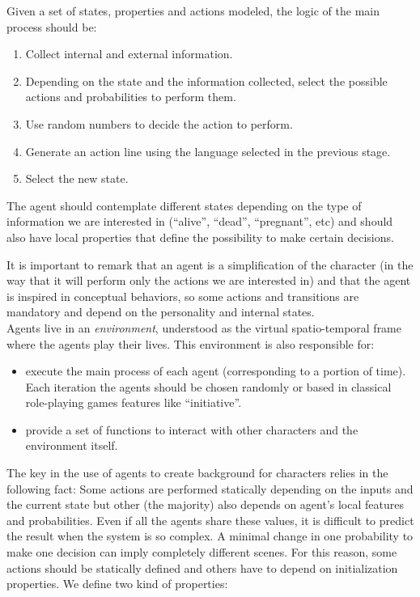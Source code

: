 \documentclass[letterpaper]{article}
\begin{document}
Given a set of states, properties and actions modeled, the logic of the main process should be:

\begin{enumerate}
\item Collect internal and external information.
\item Depending on the state and the information collected, select the possible actions and probabilities to perform them.
\item Use random numbers to decide the action to perform.
\item Generate an action line using the language selected in the previous stage.
\item Select the new state.
\end{enumerate}


The agent should contemplate different states depending on the type of information we are interested in (``alive'', ``dead'', ``pregnant'', etc) and should also have local properties that define the possibility to make certain decisions.

It is important to remark that an agent is a simplification of the character (in the way that it will perform only the actions we are interested in) and that the agent is inspired in conceptual behaviors, so some actions and transitions are mandatory and depend on the personality and internal states.\\


Agents live in an {\em environment}, understood as the virtual spatio-temporal frame where the agents play their lives. This environment is also responsible for:
\begin{itemize}
\item execute the main process of each agent (corresponding to a portion of time). Each iteration the agents should be chosen randomly or based in classical role-playing games features like ``initiative''.
\item provide a set of functions to interact with other characters and the environment itself.
\end{itemize}



The key in the use of agents to create background for characters relies in the following fact: Some actions are performed statically depending on the inputs and the current state but other (the majority) also depends on agent's local features and probabilities. Even if all the agents share these values, it is difficult to predict the result when the system is so complex. A minimal change in one probability to make one decision can imply completely different scenes.
For this reason, some actions should be statically defined and others have to depend on initialization properties. We define two kind of properties:
\end{document}
